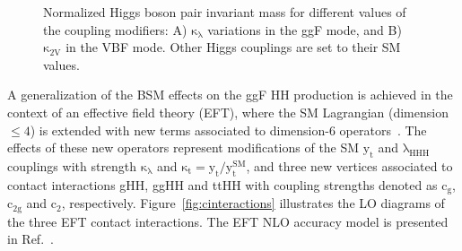 \begin{figure}[htp!]
\centering
\captionsetup[subfigure]{justification=centering}
\caption[Normalized Higgs boson pair invariant mass for different values of the coupling modifiers]{Normalized Higgs boson pair invariant mass for different values of the coupling modifiers: A) $\mathrm{\kappa_{\lambda}}$ variations in the ggF mode, and B) $\mathrm{\kappa_{2V}}$ in the VBF mode. Other Higgs couplings are set to their SM values.}
\label{fig:mhhvariation}
\end{figure}

A generalization of the BSM effects on the ggF HH production is achieved in the context of an effective field theory (EFT), where the SM Lagrangian (dimension$\leq 4$) is extended with new terms associated to dimension-6 operators~\cite{Goertz:2014qta}. The effects of these new operators represent modifications of the SM $\mathrm{y_{t}}$ and $\mathrm{\lambda_{HHH}}$ couplings with strength $\mathrm{\kappa_{\lambda}}$ and $\mathrm{\kappa_{t}=y_{t}/y_{t}^{SM}}$, and three new vertices associated to contact interactions gHH, ggHH and ttHH with coupling strengths denoted as $\mathrm{c_{g}}$, $\mathrm{c_{2g}}$ and $\mathrm{c_{2}}$, respectively. Figure~\ref{fig:cinteractions} illustrates the LO diagrams of the three EFT contact interactions. The EFT NLO accuracy model is presented in Ref.~\cite{Buchalla:2018yce}. 

